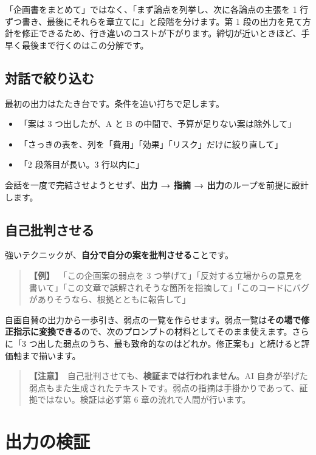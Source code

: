 \documentclass{article}
\begin{document}
「企画書をまとめて」ではなく、「まず論点を列挙し、次に各論点の主張を 1 行ずつ書き、最後にそれらを章立てに」と段階を分けます。第 1 段の出力を見て方針を修正できるため、行き違いのコストが下がります。締切が近いときほど、手早く最後まで行くのはこの分解です。

\subsection{対話で絞り込む}

最初の出力はたたき台です。条件を追い打ちで足します。

\begin{itemize}
\item 「案は 3 つ出したが、A と B の中間で、予算が足りない案は除外して」
\item 「さっきの表を、列を「費用」「効果」「リスク」だけに絞り直して」
\item 「2 段落目が長い。3 行以内に」
\end{itemize}

会話を一度で完結させようとせず、\textbf{出力 → 指摘 → 出力}のループを前提に設計します。

\subsection{自己批判させる}

強いテクニックが、\textbf{自分で自分の案を批判させる}ことです。

\begin{quote}
\textbf{【例】}\ 「この企画案の弱点を 3 つ挙げて」「反対する立場からの意見を書いて」「この文章で誤解されそうな箇所を指摘して」「このコードにバグがありそうなら、根拠とともに報告して」
\end{quote}

自画自賛の出力から一歩引き、弱点の一覧を作らせます。弱点一覧は\textbf{その場で修正指示に変換できる}ので、次のプロンプトの材料としてそのまま使えます。さらに「3 つ出した弱点のうち、最も致命的なのはどれか。修正案も」と続けると評価軸まで揃います。

\begin{quote}
\textbf{【注意】}\ 自己批判させても、\textbf{検証までは行われません}。AI 自身が挙げた弱点もまた生成されたテキストです。弱点の指摘は手掛かりであって、証拠ではない。検証は必ず第 6 章の流れで人間が行います。
\end{quote}

\section{出力の検証}
\end{document}
